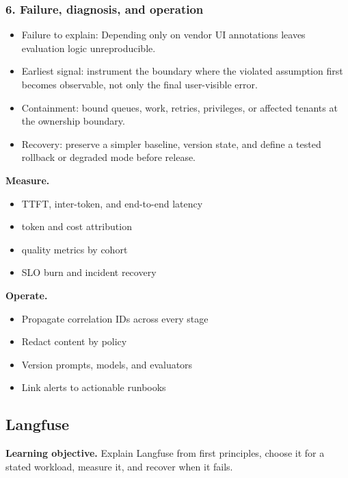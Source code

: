 \subsubsection*{6. Failure, diagnosis, and operation}
\begin{itemize}
\item Failure to explain: Depending only on vendor UI annotations leaves evaluation logic unreproducible.
\item Earliest signal: instrument the boundary where the violated assumption first becomes observable, not only the final user-visible error.
\item Containment: bound queues, work, retries, privileges, or affected tenants at the ownership boundary.
\item Recovery: preserve a simpler baseline, version state, and define a tested rollback or degraded mode before release.
\end{itemize}
\textbf{Measure.}\begin{itemize}
\item TTFT, inter-token, and end-to-end latency
\item token and cost attribution
\item quality metrics by cohort
\item SLO burn and incident recovery
\end{itemize}
\textbf{Operate.}\begin{itemize}
\item Propagate correlation IDs across every stage
\item Redact content by policy
\item Version prompts, models, and evaluators
\item Link alerts to actionable runbooks
\end{itemize}
\subsection{Langfuse}
\textbf{Learning objective.} Explain Langfuse from first principles, choose it for a stated workload, measure it, and recover when it fails.
